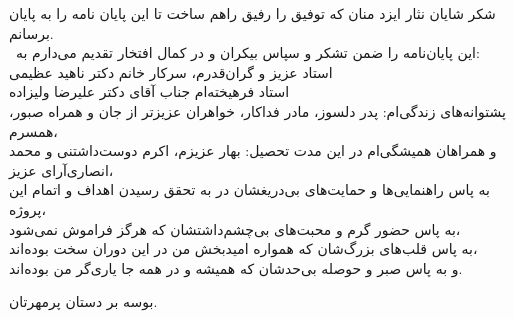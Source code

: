 شکر شایان نثار ایزد منان که توفيق را رفیق راهم ساخت تا اين پايان نامه را به پايان برسانم.\\\
این پایان‌نامه را ضمن تشکر و سپاس بیکران و در کمال افتخار تقدیم می‌دارم به:\\
استاد عزیز و گران‌‌قدرم، سرکار خانم دکتر ناهید عظیمی\\
استاد فرهیخته‌ام جناب آقای دکتر علیرضا ولیزاده\\
پشتوانه‌های زندگی‌ام: پدر دلسوز، مادر فداکار، خواهران عزیزتر از جان و همراه صبور، همسرم،\\
و همراهان همیشگی‌‌ام در این مدت تحصیل: بهار عزیزم، اکرم دوست‌داشتنی و محمد انصاری‌آرای عزیز،\\
به پاس را‌هنمایی‌ها و حمایت‌های بی‌دریغشان در به تحقق رسیدن اهداف و اتمام این پروژه،\\
به پاس حضور گرم و محبت‌های بی‌چشم‌داشتشان که هرگز فراموش نمی‌شود،\\
به پاس قلب‌های بزرگ‌شان که همواره امید‌بخش من در این دوران سخت بوده‌اند،\\
 و به پاس صبر و حوصله بی‌حدشان که همیشه و در همه جا یاری‌گر من بوده‌اند.\\
\begin{center}
{\large  بوسه بر دستان پرمهرتان.}
\end{center}




